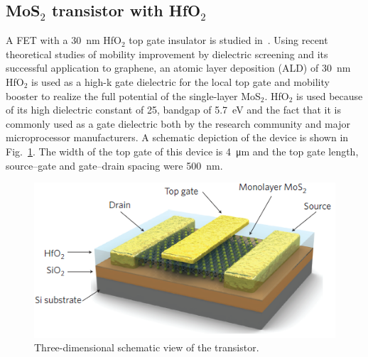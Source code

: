 \documentclass[electronics,article,submit,moreauthors,pdftex]{Definitions/mdpi}
\begin{document}
\subsection{MoS$_2$ transistor with HfO$_2$}
\label{hafnium}
A FET with a \SI{30}{\nano \meter} HfO$_2$ top gate insulator is studied in~\cite{Radisavljevic:Si_MoS2}. Using recent theoretical studies of mobility improvement by dielectric screening and its successful application to graphene, an atomic layer deposition (ALD) of \SI{30}{\nano \meter} HfO$_2$ is used as a high-k gate dielectric for the
local top gate and mobility booster to realize the full potential of the single-layer MoS$_2$. HfO$_2$ is used because of its high dielectric constant of 25, bandgap of \SI{5.7}{\electronvolt} and the fact that it is commonly used as a gate dielectric both by the research community and major microprocessor manufacturers. A schematic depiction of the device is shown in Fig.~\ref{fig:HfO2_fabrication}. The width of the top gate of this device is \SI{4}{\micro \meter} and the top gate length, source–gate and gate–drain spacing were \SI{500}{\nano \meter}.

\begin{figure}[h]
	\centering
	\includegraphics[width=.8\textwidth]{Immagini/HfO2_fabrication.png} 
	\caption{Three-dimensional schematic view of the transistor.~\cite{Radisavljevic:Si_MoS2}}
	\label{fig:HfO2_fabrication}
\end{figure} 
\end{document}
